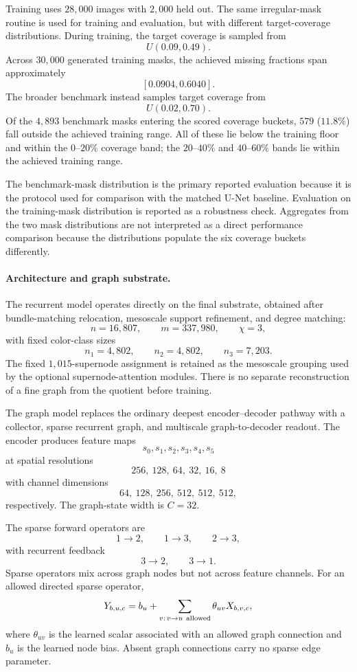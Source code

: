 \documentclass[12pt]{article}
\begin{document}
Training uses \(28{,}000\) images with \(2{,}000\) held out. The same
irregular-mask routine is used for training and evaluation, but with different
target-coverage distributions. During training, the target coverage is sampled
from
\[
U(0.09,0.49).
\]
Across \(30{,}000\) generated training masks, the achieved missing fractions
span approximately
\[
[0.0904,0.6040].
\]
The broader benchmark instead samples target coverage from
\[
U(0.02,0.70).
\]
Of the \(4{,}893\) benchmark masks entering the scored coverage buckets,
\(579\) (\(11.8\%\)) fall outside the achieved training range. All of these
lie below the training floor and within the \(0\)--\(20\%\) coverage band;
the \(20\)--\(40\%\) and \(40\)--\(60\%\) bands lie within the achieved
training range.

The benchmark-mask distribution is the primary reported evaluation because it
is the protocol used for comparison with the matched U-Net baseline.
Evaluation on the training-mask distribution is reported as a robustness
check. Aggregates from the two mask distributions are not interpreted as a
direct performance comparison because the distributions populate the six
coverage buckets differently.


\paragraph{Architecture and graph substrate.}
The recurrent model operates directly on the final substrate, obtained after
bundle-matching relocation, mesoscale support refinement, and degree matching:
\[
n=16{,}807,\qquad
m=337{,}980,\qquad
\chi=3,
\]
with fixed color-class sizes
\[
n_1=4{,}802,\qquad
n_2=4{,}802,\qquad
n_3=7{,}203.
\]
The fixed \(1{,}015\)-supernode assignment is retained as the mesoscale
grouping used by the optional supernode-attention modules. There is no
separate reconstruction of a fine graph from the quotient before training.

The graph model replaces the ordinary deepest encoder--decoder pathway with a
collector, sparse recurrent graph, and multiscale graph-to-decoder readout.
The encoder produces feature maps
\[
s_0,s_1,s_2,s_3,s_4,s_5
\]
at spatial resolutions
\[
256,\ 128,\ 64,\ 32,\ 16,\ 8
\]
with channel dimensions
\[
64,\ 128,\ 256,\ 512,\ 512,\ 512,
\]
respectively. The graph-state width is \(C=32\).

The sparse forward operators are
\[
1\to2,\qquad
1\to3,\qquad
2\to3,
\]
with recurrent feedback
\[
3\to2,\qquad
3\to1.
\]
Sparse operators mix across graph nodes but not across feature channels. For
an allowed directed sparse operator,
\[
Y_{b,u,c}
=
b_u+
\sum_{v:\,v\to u\ {\rm allowed}}
\theta_{uv}X_{b,v,c},
\]
where \(\theta_{uv}\) is the learned scalar associated with an allowed graph
connection and \(b_u\) is the learned node bias. Absent graph connections
carry no sparse edge parameter.
\end{document}
